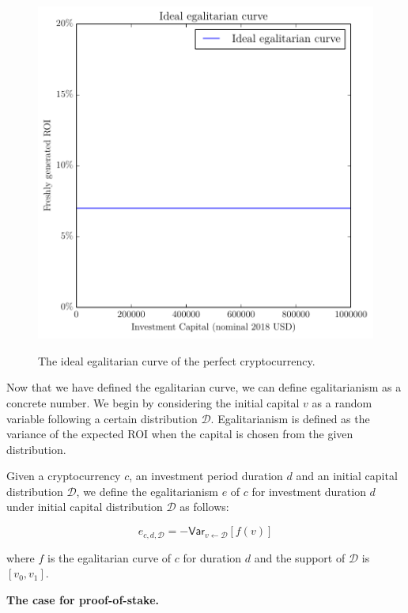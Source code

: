 \begin{figure}[H]
    \caption{The ideal egalitarian curve of the perfect cryptocurrency.}
    \centering
    \includegraphics[width=0.7 \columnwidth,keepaspectratio]{figures/ideal.pdf}
    \label{fig:ideal}
\end{figure}

Now that we have defined the egalitarian curve, we can define egalitarianism
as a concrete number. We begin by considering the initial capital $v$ as a
random variable following a certain distribution $\mathcal{D}$. Egalitarianism
is defined as the variance of the expected ROI when the capital is chosen from
the given distribution.

\begin{definition}[Egalitarianism]
  Given a cryptocurrency $c$, an investment period duration $d$ and an initial
  capital distribution $\mathcal{D}$, we define the egalitarianism $e$ of $c$
  for investment duration $d$ under initial capital distribution $\mathcal{D}$
  as follows:

  \[
    e_{c,d,\mathcal{D}} = -\textsf{Var}_{v \gets \mathcal{D}}[f(v)]
  \]

  where $f$ is the egalitarian curve of $c$ for duration $d$ and the support of
  $\mathcal{D}$ is $[v_0, v_1]$.
\end{definition}

\noindent
\textbf{The case for proof-of-stake. }

